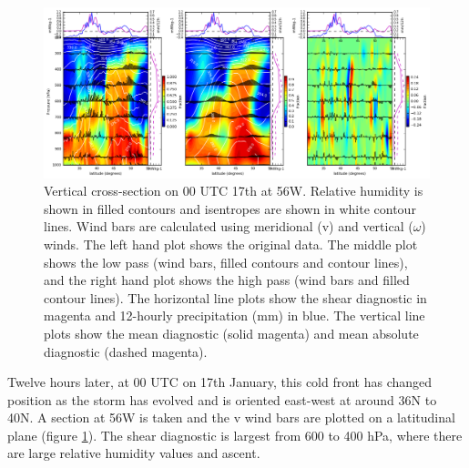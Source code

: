

%
%
\begin{figure}[h]	
	\includegraphics[width=40pc,angle=0]{cx3_sub_v_RH_pt_ens9_56W_00UTC_17th.png}
	\caption{Vertical cross-section on 00 UTC 17th at 56W. Relative humidity is shown in filled contours and isentropes are shown in white contour lines. Wind bars are calculated using meridional (v) and vertical ($\omega$) winds. The left hand plot shows the original data. The middle plot shows the low pass (wind bars, filled contours and contour lines), and the right hand plot shows the high pass (wind bars and filled contour lines). The horizontal line plots show the shear diagnostic in magenta and 12-hourly precipitation (mm) in blue. The vertical line plots show the mean diagnostic (solid magenta) and mean absolute diagnostic (dashed magenta).}\label{fig:HC_cxC}
	\centering
\end{figure}

Twelve hours later, at 00 UTC on 17th January, this cold front has changed position as the storm has evolved and is oriented east-west at around 36N to 40N. A section at 56W is taken and the v wind bars are plotted on a latitudinal plane (figure \ref{fig:HC_cxC}). The shear diagnostic is largest from 600 to 400 hPa, where there are large relative humidity values and ascent.


